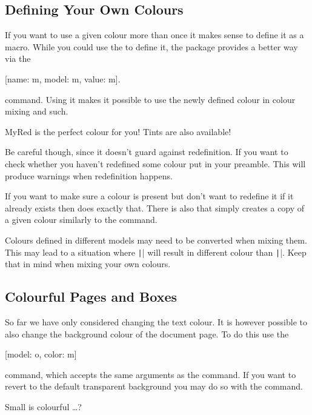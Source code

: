 \subsection{Defining Your Own Colours}

If you want to use a given colour more than once it makes sense to define
it as a macro. While you could use the  to define it,
the  package provides a better way via the
\begin{lscommand}
  [name: m, model: m, value: m].
\end{lscommand}
command. Using it makes it possible to use the newly defined colour in colour
mixing and such.
\begin{example}
\textcolor{MyRed}{MyRed is
  the perfect colour for you!}
\textcolor{MyRed!60}{Tints
  are also available!}
\end{example}
Be careful though, since it doesn't guard against redefinition. If you want to
check whether you haven't redefined some colour put  in your
preamble. This will produce warnings when redefinition happens.

If you want to make sure a colour is present but don't want to redefine it if it
already exists then  does exactly that. There is also
 that simply creates a copy of a given colour similarly to the
 command.

Colours defined in different models may need to be converted when mixing them.
This may lead to a situation where \texttt|\color{a!75!b}| will
result in different colour than \texttt|\color{b!25!a}|. Keep that in
mind when mixing your own colours.

\subsection{Colourful Pages and Boxes}

So far we have only considered changing the text colour. It is however possible
to also change the background colour of the document page. To do this use the
\begin{lscommand}
  [model: o, color: m]
\end{lscommand}
command, which accepts the same arguments as the  command. If you
want to revert to the default transparent background you may do so with the
 command.
\begin{example}[standalone, paperheight=1cm]
\usepackage{xcolor} %
\pagecolor{orange} \color{-orange}
Small is colourful \ldots?
\end{example}

